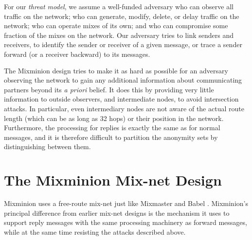 \documentclass[final]{ieee}
\begin{document}
For our \emph{threat model}, we assume a well-funded adversary who can 
observe all traffic on the
network; who can generate, modify, delete, or delay traffic on the
network; who can operate mixes of its own; and who can compromise some
fraction of the mixes on the network. Our adversary tries to
link senders and receivers, to identify the sender or
receiver of a given message, or trace a sender forward (or a receiver
backward) to its messages.

The Mixminion design tries to make it as hard as possible for an
adversary observing the network to gain any additional information
about communicating partners beyond its \emph{a priori} belief. It does
this by providing very little information to outside observers, and
intermediate nodes, to avoid intersection attacks. In particular, even
intermediary nodes are not aware of the actual route length (which can
be as long as 32 hops) or their position in the network. Furthermore,
the processing for replies is exactly the same as for normal messages,
and it is therefore difficult to partition the anonymity sets by
distinguishing between them. 



\section{The Mixminion Mix-net Design}

\label{sec:design}

Mixminion uses a free-route mix-net just like Mixmaster \cite{mixmaster-spec}
and Babel \cite{babel}.
Mixminion's principal difference from earlier mix-net
designs is the mechanism it uses to support reply messages with the
same processing machinery as forward messages, while at the same time
resisting the attacks described above.
\end{document}
